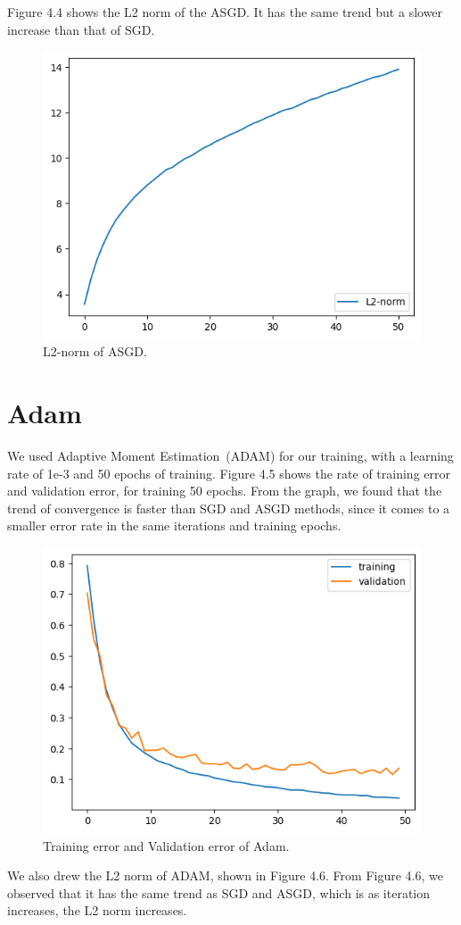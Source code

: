Figure 4.4 shows the L2 norm of the ASGD. It has the same trend but a slower increase than that of SGD.

\begin{figure}[H]
    \centering %
        \includegraphics[width=0.6\linewidth]{./ASGDl2.png} 
    \caption{L2-norm of ASGD.}
\end{figure}

\section{Adam}
We used Adaptive Moment Estimation\ (ADAM) for our training, with a learning rate of 1e-3 and 50 epochs of training. Figure 4.5 shows the rate of training error and validation error, for training 50 epochs. From the graph, we found that the trend of convergence is faster than SGD and ASGD methods, since it comes to a smaller error rate in the same iterations and training epochs.

\begin{figure}[H]
    \centering %
        \includegraphics[width=0.6\linewidth]{./ADAM.png} 
    \caption{Training error and Validation error of Adam.}
\end{figure}

We also drew the L2 norm of ADAM, shown in Figure 4.6. From Figure 4.6, we observed that it has the same trend as SGD and ASGD, which is as iteration increases, the L2 norm increases.


